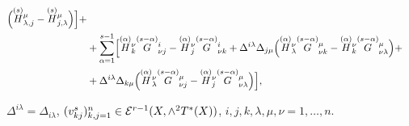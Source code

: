 \begin{thm}
\begin{equation}
\begin{split}
\Bigl(\sv{(s)}H^{\mu}_{\lambda,j}-\sv{(s)}H^{\mu}_{j,\lambda}


\Bigr)\Bigr]+\\


&+\sum_{\alpha=1}^{s-1}\Bigl[\sv{(\alpha)}H^{\nu}_k\sv{(s-\alpha)}


G^i_{\nu j}-


\sv{(\alpha)}H^{\nu}_j\sv{(s-\alpha)}G^i_{\nu k}+


\Delta^{i\lambda}


\Delta_{j\mu}\Bigl(\sv{(\alpha)}H^{\nu}_{\lambda}


\sv{(s-\alpha)}G^{\mu}_{\nu k}-\sv{(\alpha)}H^{\nu}_k


\sv{(s-\alpha)}G^{\mu}_{\nu\lambda}\Bigr)+\\


&+\Delta^{i \lambda}\Delta_{k \mu}\Bigl(


\sv{(\alpha)}H^{\nu}_{\lambda}\sv{(s-\alpha)}G^{\mu}_{\nu j}-


\sv{(\alpha)}H^{\nu}_j\sv{(s-\alpha)}G^{\mu}_{\nu\lambda}\Bigr)\Bigr],


\end{split}


\end{equation}


$\Delta^{i\lambda}=\Delta_{i\lambda}$, $(v^s_{kj})_{k,j=1}^n\in{\cal


E}^{r-1}(X,\wedge^2T^*(X))$, $i,j,k,\lambda,\mu,\nu=1,\dotsc,n$.


\end{thm}





